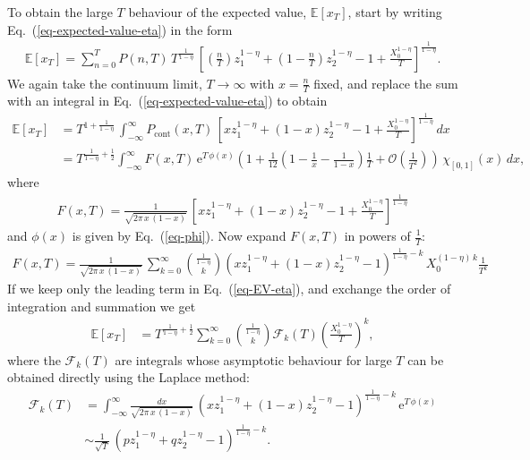 \documentclass[11pt]{article}
\begin{document}
To obtain the large $T$ behaviour of the expected value, $\mathbb{E}\left[x_T \right] $,  start by writing
Eq.~(\ref{eq-expected-value-eta}) in the form
\begin{align*}
 \mathbb{E}\left[x_T \right]  =  \sum_{n=0}^T  P(n,T) \,T^\frac{1}{1-\eta}\, \left[ \left(\frac{n}{T}\right) z_1^{1-\eta} + \left(1-\frac{n}{T}\right) z_2^{1-\eta} -1 + \frac{X_0^{1-\eta}}{T}\right]^\frac{1}{1-\eta}.
\end{align*}
We again take the continuum limit, $T\to \infty$ with $x=\frac{n}{T}$ fixed, and replace the sum with an integral in Eq.~(\ref{eq-expected-value-eta}) to obtain
\begin{align}
\nonumber \mathbb{E}\left[x_T \right] & =  T^{1+\frac{1}{1-\eta}}\, \int_{-\infty}^\infty P_\text{cont}(x, T)\,  \left[ x z_1^{1-\eta} + \left(1-x\right) z_2^{1-\eta} -1 + \frac{X_0^{1-\eta}}{T}\right]^\frac{1}{1-\eta}\,d x\\
  \label{eq-EV-eta}&= T^{\frac{1}{1-\eta}+\frac{1}{2}}  \int_{-\infty}^\infty F(x,T) \,\mathrm{e}^{T\,\phi(x)}\left(1 + \frac{1}{12}\left( 1-\frac{1}{x} - \frac{1}{1-x}\right) \frac{1}{T}   + \mathcal{O}\left(\frac{1}{T^2}\right)\right) \, \chi_{\left[0, 1\right]}(x) \, dx,
\end{align} 
where
\begin{align*}
F(x,T) = \frac{1}{\sqrt{2 \pi \,x\,(1-x)}} \,  \left[ x z_1^{1-\eta} + \left(1-x\right) z_2^{1-\eta} -1 + \frac{X_0^{1-\eta}}{T}\right]^\frac{1}{1-\eta}
\end{align*}
and $\phi(x)$ is given by Eq.~(\ref{eq-phi}). Now expand $F(x,T)$ in powers of $\frac{1}{T}$:
\begin{align*}
F(x,T) =  \frac{1}{\sqrt{2 \pi \,x\,(1-x)}} \,   \sum_{k=0}^\infty {\frac{1}{1-\eta} \choose k} \left(x z_1^{1-\eta} + \left(1-x\right) z_2^{1-\eta} -1 \right)^{\frac{1}{1-\eta}-k}\,X_0^{(1-\eta)\,k}\frac{1}{T^k}
\end{align*}
If we keep only the leading term in Eq.~(\ref{eq-EV-eta}), and exchange the order of integration and summation we get
\begin{align}
\label{eq-EV-eta-2}
\mathbb{E}\left[x_T \right] & =  T^{\frac{1}{1-\eta}+\frac{1}{2}}   \sum_{k=0}^\infty {\frac{1}{1-\eta} \choose k}  \mathcal{F}_k(T) \left(\frac{X_0^{1-\eta}}{T}\right)^k,
\end{align}
where the $\mathcal{F}_k(T)$ are integrals whose asymptotic behaviour for large $T$ can be obtained directly using the Laplace method:
\begin{align}
\mathcal{F}_k(T) &=   \int_{-\infty}^\infty    \frac{dx}{\sqrt{2 \pi \,x\,(1-x)}}\,\left(x z_1^{1-\eta} + \left(1-x\right) z_2^{1-\eta} -1 \right)^{\frac{1}{1-\eta}-k}\, \mathrm{e}^{T\,\phi(x)} \\
&\sim \frac{1}{\sqrt{T}}\, \left( p z_1^{1-\eta} + q z_2^{1-\eta} -1\right)^{\frac{1}{1-\eta}-k}.
\end{align}
\end{document}
